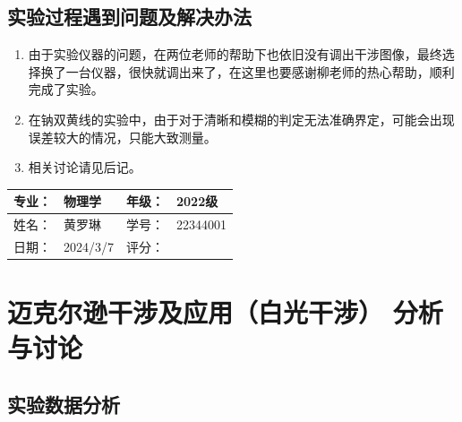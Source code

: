 \documentclass[dvipsnames, svgnames,a4paper,11pt]{article}
\begin{document}
	\subsection{实验过程遇到问题及解决办法}
	\begin{enumerate}
		\item 由于实验仪器的问题，在两位老师的帮助下也依旧没有调出干涉图像，最终选择换了一台仪器，很快就调出来了，在这里也要感谢柳老师的热心帮助，顺利完成了实验。
		\item 在钠双黄线的实验中，由于对于清晰和模糊的判定无法准确界定，可能会出现误差较大的情况，只能大致测量。
		\item 相关讨论请见后记。
	\end{enumerate}

	
	
	\clearpage
	
	\begin{table}
		\renewcommand\arraystretch{1.7}
		\begin{tabularx}{\textwidth}{|X|X|X|X|}
			\hline
			专业：& 物理学 &年级：& 2022级\\
			\hline
			姓名： & 黄罗琳 & 学号：& 22344001\\
			\hline
			日期：& 2024/3/7 & 评分： &\\
			\hline
		\end{tabularx}
	\end{table}
	
	\section{迈克尔逊干涉及应用（白光干涉） \quad\heiti  分析与讨论}
	
	\subsection{实验数据分析}

\end{document}
